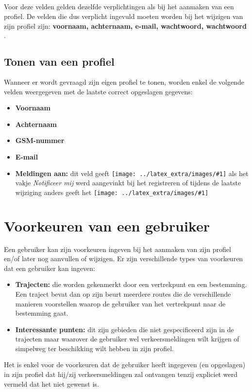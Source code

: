 \documentclass{scrbook}
\newcommand*{\veld}[1]{
	\item \textbf{#1} 
}
\newcommand*{\verplicht}[1]{
	\textbf{#1}
}
\newcommand*{\copyimageH}[2]{ 			%
	\texttt{[image: ../latex\_extra/images/\#1]}
}
\begin{document}
 \paragraph{}Voor deze velden gelden dezelfde verplichtingen als bij het aanmaken van een profiel. De velden die dus verplicht ingevuld moeten worden bij het wijzigen van zijn profiel zijn: \verplicht{voornaam, achternaam, e-mail, wachtwoord, wachtwoord}.

 \section{Tonen van een profiel}
Wanneer er wordt gevraagd zijn eigen profiel te tonen, worden enkel de volgende velden weergegeven met de laatste correct opgeslagen gegevens:
\begin{itemize}
\veld{Voornaam}
\veld{Achternaam}
\veld{GSM-nummer}
\veld{E-mail}
\veld{Meldingen aan:} dit veld geeft \copyimageH{vinkje.PNG}{1em} als het vakje \textit{Notificeer mij} werd aangevinkt bij het registreren of tijdens de laatste wijziging anders geeft het \copyimageH{krijsje.PNG}{1em}
\end{itemize}


\chapter{Voorkeuren van een gebruiker}\label{pref}
Een gebruiker kan zijn voorkeuren ingeven bij het aanmaken van zijn profiel en/of later nog aanvullen of wijzigen. Er zijn verschillende types van voorkeuren dat een gebruiker kan ingeven:
\begin{itemize}
\item \textbf{Trajecten:} die worden gekenmerkt door een vertrekpunt en een bestemming. Een traject bevat dan op zijn beurt meerdere routes die de verschillende manieren voorstellen waarop de gebruiker van het vertrekpunt naar de bestemming gaat.
\item \textbf{Interessante punten:} dit zijn gebieden die niet gespecificeerd zijn in de trajecten maar waarover de gebruiker wel verkeersmeldingen wilt krijgen of simpelweg ter beschikking wilt hebben in zijn profiel.%
\end{itemize}
Het is enkel voor de voorkeuren dat de gebruiker heeft ingegeven (en opgeslagen) in zijn profiel dat hij/zij verkeersmeldingen zal ontvangen tenzij expliciet werd vermeld %
dat het niet gewenst is.\\
\end{document}
